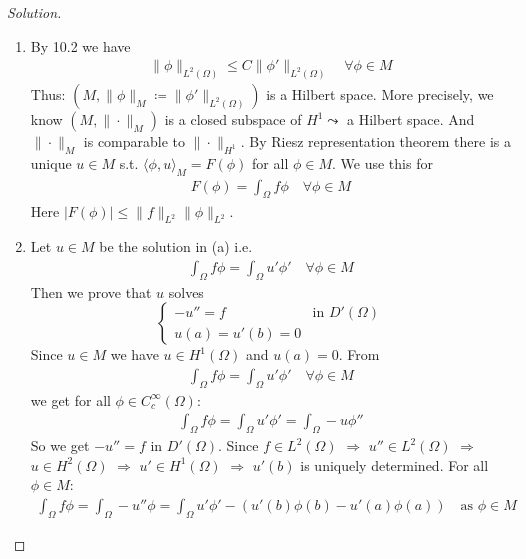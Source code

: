 \documentclass{report}
\theoremstyle{tommy}
\begin{document}
  \begin{proof}[Solution]
    \begin{enumerate}[label=\alph*)]
      \item By 10.2 we have
      \begin{align*}
        \|\phi\|_{L^2(\Omega)} \le C \|\phi'\|_{L^2(\Omega)} \quad \forall \phi \in M
      \end{align*}
      Thus: \((M, \|\phi\|_M \coloneqq \|\phi'\|_{L^2(\Omega)})\) is a Hilbert space. More precisely, we know \((M, \|\cdot \|_M)\) is a closed subspace of \(H^1 \leadsto\) a Hilbert space. And \(\|\cdot\|_M\) is comparable to \(\| \cdot \|_{H^1}\). By Riesz representation theorem there is a unique \(u \in M\) s.t. \(\langle \phi , u \rangle_M = F(\phi)\) for all \(\phi \in M\). We use this for 
      \begin{align*}
        F(\phi) = \int_\Omega f \phi \quad \forall \phi \in M
      \end{align*}
      Here \(|F(\phi)| \le \|f\|_{L^2} \|\phi\|_{L^2}\).
      \item Let \(u \in M\) be the solution in (a) i.e. 
      \begin{align*}
        \int_\Omega f \phi = \int_\Omega u'\phi' \quad \forall \phi \in M
      \end{align*}
      Then we prove that \(u\) solves 
      \[\begin{cases}
        -u'' = f &\text{in } D'(\Omega) \\ u(a) = u'(b) = 0
      \end{cases}\]
      Since \(u \in M\) we have \(u \in H^1(\Omega)\) and \(u(a) = 0\). From 
      \begin{align*}
        \int_\Omega f \phi = \int_\Omega u' \phi' \quad \forall \phi \in M
      \end{align*}
      we get for all \(\phi \in C_c^\infty(\Omega)\):
      \begin{align*}
        \int_\Omega f \phi = \int_\Omega u' \phi' = \int_\Omega - u \phi''
      \end{align*}
      So we get \(- u'' = f\) in \(D'(\Omega)\). Since \(f \in L^2(\Omega)\) \(\Rightarrow\) \(u'' \in L^2(\Omega)\) \(\Rightarrow\) \(u \in H^2(\Omega)\) \(\Rightarrow\) \(u' \in H^1(\Omega)\) \(\Rightarrow\) \(u'(b)\) is uniquely determined. For all \(\phi \in M\):
      \begin{align*}
        \int_\Omega f \phi = \int_\Omega- u'' \phi = \int_\Omega u' \phi' - \left(u'(b) \phi(b) - u'(a) \phi(a)\right) \quad \text{as } \phi \in M

\end{align*}
\end{enumerate}
\end{proof}
\end{document}
